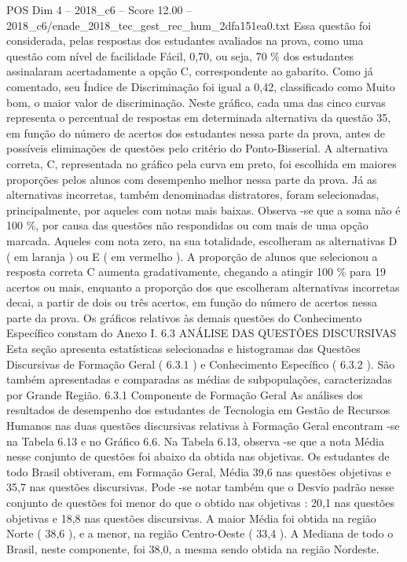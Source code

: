 \begin{textsample}{POS Dim 4 – 2018\_c6 – Score 12.00 – 2018\_c6/enade\_2018\_tec\_gest\_rec\_hum\_2dfa151ea0.txt}
Essa questão foi considerada, pelas respostas dos estudantes avaliados na prova, como uma questão com nível de facilidade Fácil, 0,70, ou seja, 70 \% dos estudantes assinalaram acertadamente a opção C, correspondente ao gabarito.
Como já comentado, seu Índice de Discriminação foi igual a 0,42, classificado como Muito bom, o maior valor de discriminação.
Neste gráfico, cada uma das cinco curvas representa o percentual de respostas em determinada alternativa da questão 35, em função do número de acertos dos estudantes nessa parte da prova, antes de possíveis eliminações de questões pelo critério do Ponto-Bisserial.
A alternativa correta, C, representada no gráfico pela curva em preto, foi escolhida em maiores proporções pelos alunos com desempenho melhor nessa parte da prova.
Já as alternativas incorretas, também denominadas distratores, foram selecionadas, principalmente, por aqueles com notas mais baixas.
Observa -se que a soma não é 100 \%, por causa das questões não respondidas ou com mais de uma opção marcada.
Aqueles com nota zero, na sua totalidade, escolheram as alternativas D ( em laranja ) ou E ( em vermelho ).
A proporção de alunos que selecionou a resposta correta C aumenta gradativamente, chegando a atingir 100 \% para 19 acertos ou mais, enquanto a proporção dos que escolheram alternativas incorretas decai, a partir de dois ou três acertos, em função do número de acertos nessa parte da prova.
Os gráficos relativos às demais questões do Conhecimento Específico constam do Anexo I. 6.3 ANÁLISE DAS QUESTÕES DISCURSIVAS Esta seção apresenta estatísticas selecionadas e histogramas das Questões Discursivas de Formação Geral ( 6.3.1 ) e Conhecimento Específico ( 6.3.2 ).
São também apresentadas e comparadas as médias de subpopulações, caracterizadas por Grande Região. 6.3.1 Componente de Formação Geral As análises dos resultados de desempenho dos estudantes de Tecnologia em Gestão de Recursos Humanos nas duas questões discursivas relativas à Formação Geral encontram -se na Tabela 6.13 e no Gráfico 6.6.
Na Tabela 6.13, observa -se que a nota Média nesse conjunto de questões foi abaixo da obtida nas objetivas.
Os estudantes de todo Brasil obtiveram, em Formação Geral, Média 39,6 nas questões objetivas e 35,7 nas questões discursivas.
Pode -se notar também que o Desvio padrão nesse conjunto de questões foi menor do que o obtido nas objetivas : 20,1 nas questões objetivas e 18,8 nas questões discursivas.
A maior Média foi obtida na região Norte ( 38,6 ), e a menor, na região Centro-Oeste ( 33,4 ).
A Mediana de todo o Brasil, neste componente, foi 38,0, a mesma sendo obtida na região Nordeste.

\end{textsample}
